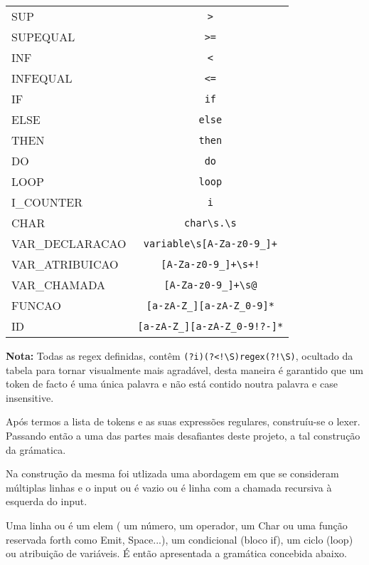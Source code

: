 \documentclass{article}
\begin{document}
\begin{center}
\begin{tabular}{|l|c|}
        SUP & \verb|>| \\
        SUPEQUAL & \verb|>=| \\
        INF & \verb|<| \\
        INFEQUAL & \verb|<=| \\
        IF & \verb|if| \\
        ELSE & \verb|else| \\
        THEN & \verb|then| \\
        DO & \verb|do| \\
        LOOP & \verb|loop| \\
        I\_COUNTER & \verb|i| \\
        CHAR & \verb|char\s.\s| \\
        VAR\_DECLARACAO & \verb|variable\s[A-Za-z0-9_]+| \\
        VAR\_ATRIBUICAO & \verb|[A-Za-z0-9_]+\s+!| \\
        VAR\_CHAMADA & \verb|[A-Za-z0-9_]+\s@| \\
        FUNCAO & \verb|[a-zA-Z_][a-zA-Z_0-9]*| \\
        ID & \verb|[a-zA-Z_][a-zA-Z_0-9!?-]*| \\
\hline
\end{tabular}
\end{center}

\vspace{1cm}

\smallskip
    \noindent \textbf{Nota:} Todas as regex definidas, contêm \verb|(?i)(?<!\S)regex(?!\S)|, ocultado da tabela para tornar visualmente mais agradável, desta  maneira é garantido que um token de facto é uma única palavra e não está contido noutra palavra e case insensitive.

Após termos a lista de tokens e as suas expressões regulares, construíu-se o lexer. Passando então a uma das partes mais desafiantes deste projeto, a tal construção da grámatica.

Na construção da mesma foi utlizada uma abordagem em que se consideram múltiplas linhas e o input ou é vazio ou é linha com a chamada recursiva à esquerda do input.

Uma linha ou é um elem ( um número, um operador, um Char ou uma função reservada forth como Emit, Space...), um condicional (bloco if), um ciclo (loop) ou atribuição de variáveis.
É então apresentada a gramática concebida abaixo.
\end{document}
